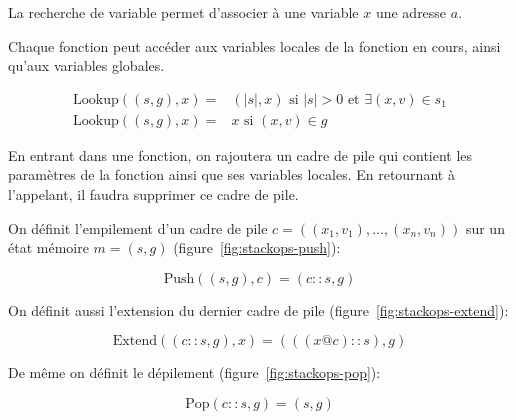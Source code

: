 \begin{definition}

  La recherche de variable permet d'associer à une variable $x$ une adresse $a$.

  Chaque fonction peut accéder aux variables locales de la fonction en cours,
  ainsi qu'aux variables globales.

  \begin{align*}
    \mathrm{Lookup} ((s, g), x) = & (|s|, x)
                                    \mbox{ si }|s| > 0
                                    \mbox{ et }∃ (x, v) ∈ s_1 \\
    \mathrm{Lookup} ((s, g), x) = & x \mbox{ si } (x, v) ∈ g
  \end{align*}

\end{definition}

En entrant dans une fonction, on rajoutera un cadre de pile qui contient les
paramètres de la fonction ainsi que ses variables locales. En retournant à
l'appelant, il faudra supprimer ce cadre de pile.

\begin{definition}

  On définit l'empilement d'un cadre de pile $c = ((x_1, v_1), …, (x_n, v_n))$
  sur un état mémoire $m = (s, g)$ (figure~\ref{fig:stackops-push}):

  \[
    \mathrm{Push}((s, g), c) = (c::s, g)
  \]

  On définit aussi l'extension du dernier cadre de pile
  (figure~\ref{fig:stackops-extend}):

  \[
    \mathrm{Extend}((c::s, g), x) = (((x @ c) :: s), g)
  \]

  De même on définit le dépilement (figure~\ref{fig:stackops-pop}):

  \[
    \mathrm{Pop}(c::s, g) = (s, g)
  \]

\end{definition}

